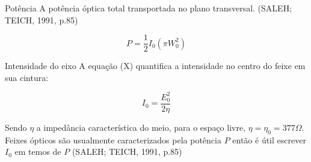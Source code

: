 \documentclass{fei}
\begin{document}
Potência
A potência óptica total transportada no plano transversal. (SALEH; TEICH, 1991, p.85)

\begin{equation}
\label{eq:potencia}
P = \frac{1}{2}I_0(\pi W_0^2)
\end{equation}

Intensidade do eixo
A equação (X) quantifica a intensidade no centro do feixe em sua cintura:

\begin{equation}
\label{eq:intencidade_eixo}
I_0 = \frac{E_0^2}{2\eta}
\end{equation}

Sendo $\eta$ a impedância característica do meio, para o espaço livre, $\eta = \eta_0 = 377 \Omega$. Feixes ópticos são usualmente caracterizados pela potência $P$ então é útil escrever $I_0$ em temos de $P$ (SALEH; TEICH, 1991, p.85)

\printbibliography
\end{document}
